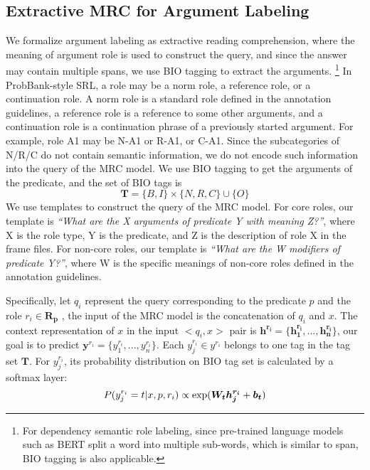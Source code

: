 \documentclass[11pt]{article}
\begin{document}
\subsection{Extractive MRC for Argument Labeling}
\label{sec:labeling}
We formalize argument labeling as extractive reading comprehension, where the meaning of argument role is used to construct the query, and since the answer may contain multiple spans, we use BIO tagging to extract the arguments. 
\footnote{For dependency semantic role labeling, since pre-trained language models such as BERT split a word into multiple sub-words, which is similar to span, BIO tagging is also applicable.}
In ProbBank-style SRL, a role may be a norm role, a reference role, or a continuation role. A norm role is a standard role defined in the annotation guidelines, a reference role is a reference to some other arguments, and a continuation role is a continuation phrase of a previously started argument. For example, role A1 may be N-A1 or R-A1, or C-A1. Since the subcategories of N/R/C do not contain semantic information, we do not encode such information into the query of the MRC model. We use BIO tagging to get the arguments of the predicate, and the set of BIO tags is
\begin{equation}
    \bm{T} = \{B,I\}\times\{N,R,C\}\cup\{O\}
\end{equation}
We use templates to construct the query of the MRC model. For core roles, our template is \textit{``What are the X arguments of predicate Y with meaning Z?''}, where X is the role type, Y is the predicate, and Z is the description of role X in the frame files.
For non-core roles, our template is \textit{``What are the W modifiers of predicate Y?''}, where W is the specific meanings of non-core roles defined in the annotation guidelines.
\par
Specifically, let $q_i$ represent the query corresponding to the predicate $p$ and the role $r_i \in \bm{R_p}$ , the input of the MRC model is the concatenation of $q_i$ and $x$. The context representation of $x$ in the input $<q_i, x>$ pair is $\bm{h^{r_i}}=\{\bm{h^{r_i}_1},...,\bm{h^{r_i}_n}\}$, our goal is to predict $\bm{y}^{r_i}=\{y^{r_i}_1,...,y^{r_i}_n\}$. Each $y^{r_i}_j \in y^{r_i}$ belongs to one tag in the tag set $\bm{T}$. For  $y^{r_i}_j$, its probability distribution on BIO tag set is calculated by a softmax layer:
\begin{equation}
    P(y^{r_i}_j=t|x,p,r_i) \propto {\rm exp}({\bm{W_{t}}}\bm{h^{r_i}_j}+\bm{b_t})
\end{equation}
\end{document}
